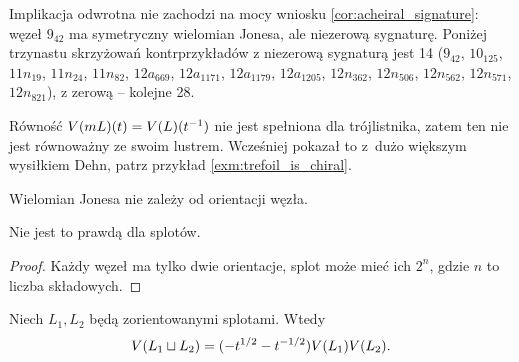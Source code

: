 Implikacja odwrotna nie zachodzi na mocy wniosku \ref{cor:acheiral_signature}: węzeł $9_{42}$ ma symetryczny wielomian Jonesa, ale niezerową sygnaturę.
%
Poniżej trzynastu skrzyżowań kontrprzykładów z niezerową sygnaturą jest 14 ($9_{42}$, $10_{125}$, $11n_{19}$, $11n_{24}$, $11n_{82}$, $12a_{669}$, $12a_{1171}$, $12a_{1179}$, $12a_{1205}$, $12n_{362}$, $12n_{506}$, $12n_{562}$, $12n_{571}$, $12n_{821}$), z zerową -- kolejne 28.

Równość $V(mL)(t) = V(L)(t^{-1})$ nie jest spełniona dla trójlistnika, zatem ten nie jest równoważny ze swoim lustrem.
Wcześniej pokazał to z~dużo większym wysiłkiem Dehn, patrz przykład \ref{exm:trefoil_is_chiral}.
%

\begin{corollary}
    Wielomian Jonesa nie zależy od orientacji węzła.
\end{corollary}

Nie jest to prawdą dla splotów.

\begin{proof}
    Każdy węzeł ma tylko dwie orientacje, splot może mieć ich $2^n$, gdzie $n$ to liczba składowych.
\end{proof}

\begin{proposition}
%
\label{prp:jones_multiplicative_1}%
    Niech $L_1, L_2$ będą zorientowanymi splotami.
    Wtedy
    \begin{equation}
        V(L_1 \sqcup L_2) = (-t^{1/2} - t^{-1/2}) V(L_1) V(L_2).
    \end{equation}
\end{proposition}

